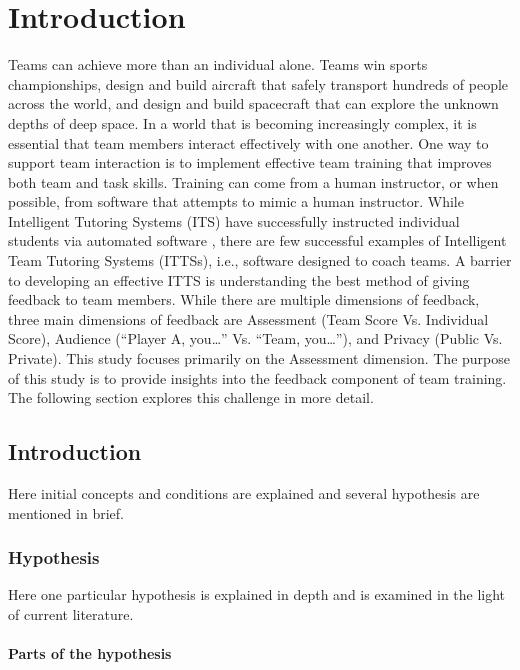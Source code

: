 \chapter{Introduction}

Teams can achieve more than an individual alone. Teams win sports championships, design and build aircraft that safely transport hundreds of people across the world, and design and build spacecraft that can explore the unknown depths of deep space. In a world that is becoming increasingly complex, it is essential that team members interact effectively with one another. One way to support team interaction is to implement effective team training that improves both team and task skills. Training can come from a human instructor, or when possible, from software that attempts to mimic a human instructor. While Intelligent Tutoring Systems (ITS) have successfully instructed individual students via automated software \citep{Aleven2006, Graesser2018, Hategekimana2008,Koedinger2004}, there are few successful examples of Intelligent Team Tutoring Systems (ITTSs), i.e., software designed to coach teams. A barrier to developing an effective ITTS is understanding the best method of giving feedback to team members. While there are multiple dimensions of feedback, three main dimensions of feedback are Assessment (Team Score Vs. Individual Score), Audience (“Player A, you…” Vs. “Team, you…”), and Privacy (Public Vs. Private). This study focuses primarily on the Assessment dimension. The purpose of this study is to provide insights into the feedback component of team training. The following section explores this challenge in more detail. 

\section{Introduction}

Here initial concepts and conditions are explained and
several hypothesis are mentioned in brief.

\subsection{Hypothesis}

Here one particular hypothesis is explained in depth
and is examined in the light of current literature.

\subsubsection{Parts of the hypothesis}

